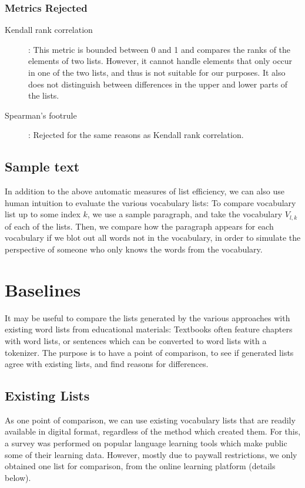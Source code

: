 \subsubsection{Metrics Rejected}
\begin{description}
	\item [Kendall rank correlation ] \cite{kendallNEWMEASURERANK1938b}: This metric is bounded between 0 and 1 and compares the ranks of the elements of two lists. However, it cannot handle elements that only occur in one of the two lists, and thus is not suitable for our purposes. It also does not distinguish between differences in the upper and lower parts of the lists.
	\item [Spearman's footrule] \cite{spearmanCorrelationCalculatedFaulty1910}: Rejected for the same reasons as Kendall rank correlation.
\end{description}


\subsection{Sample text}
In addition to the above automatic measures of list efficiency, we can also use human intuition to evaluate the various vocabulary lists:
To compare vocabulary list up to some index $k$, we use a sample paragraph, and take the vocabulary $V_{l, k}$ of each of the lists.
Then, we compare how the paragraph appears for each vocabulary if we blot out all words not in the vocabulary, in order to simulate the perspective of someone who only knows the words from the vocabulary.







\section{Baselines}
It may be useful to compare the lists generated by the various approaches with existing word lists from educational materials:
Textbooks often feature chapters with word lists, or sentences which can be converted to word lists with a tokenizer.
The purpose is to have a point of comparison, to see if generated lists agree with existing lists, and find reasons for differences.

\subsection{Existing Lists}
As one point of comparison, we can use existing vocabulary lists that are readily available in digital format, regardless of the method which created them.
For this, a survey was performed on popular language learning tools which make public some of their learning data.
However, mostly due to paywall restrictions, we only obtained one list for comparison, from the online learning platform \Rosetta (details below).

